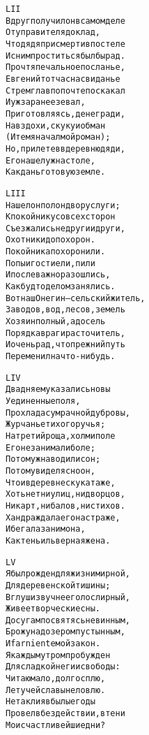 \begin{minipage}[t]{\dimexpr 0.5\textwidth -\tabcolsep-.5pt}
\begin{alltt}\normalfont\centering
LII
Вдруг получил он в самом деле
От управителя доклад,
Что дядя при смерти в постеле
И с ним проститься был бы рад.
Прочтя печальное посланье,
Евгений тотчас на свиданье
Стремглав по почте поскакал
И уж заранее зевал,
Приготовляясь, денег ради,
На вздохи, скуку и обман
(И тем я начал мой роман);
Но, прилетев в деревню дяди,
Его нашел уж на столе,
Как дань готовую земле.
\end{alltt}
\end{minipage}
\clearpage

\begin{minipage}[t]{\dimexpr 0.5\textwidth -\tabcolsep-.5pt}
\begin{alltt}\normalfont\centering
LIII
Нашел он полон двор услуги;
К покойнику со всех сторон
Съезжались недруги и други,
Охотники до похорон.
Покойника похоронили.
Попы и гости ели, пили
И после важно разошлись,
Как будто делом занялись.
Вот наш Онегин — сельский житель,
Заводов, вод, лесов, земель
Хозяин полный, а досель
Порядка враг и расточитель,
И очень рад, что прежний путь
Переменил на что-нибудь.
\end{alltt}
\end{minipage}

\begin{minipage}[t]{\dimexpr 0.5\textwidth -\tabcolsep-.5pt}
\begin{alltt}\normalfont\centering
LIV
Два дня ему казались новы
Уединенные поля,
Прохлада сумрачной дубровы,
Журчанье тихого ручья;
На третий роща, холм и поле
Его не занимали боле;
Потом уж наводили сон;
Потом увидел ясно он,
Что и в деревне скука та же,
Хоть нет ни улиц, ни дворцов,
Ни карт, ни балов, ни стихов.
Хандра ждала его на страже,
И бегала за ним она,
Как тень иль верная жена.
\end{alltt}
\end{minipage}
\clearpage

\begin{minipage}[t]{\dimexpr 0.5\textwidth -\tabcolsep-.5pt}
\begin{alltt}\normalfont\centering
LV
Я был рожден для жизни мирной,
Для деревенской тишины;
В глуши звучнее голос лирный,
Живее творческие сны.
Досугам посвятясь невинным,
Брожу над озером пустынным,
И far niente мой закон.
Я каждым утром пробужден
Для сладкой неги и свободы:
Читаю мало, долго сплю,
Летучей славы не ловлю.
Не так ли я в былые годы
Провел в бездействии, в тени
Мои счастливейшие дни?
\end{alltt}
\end{minipage}

